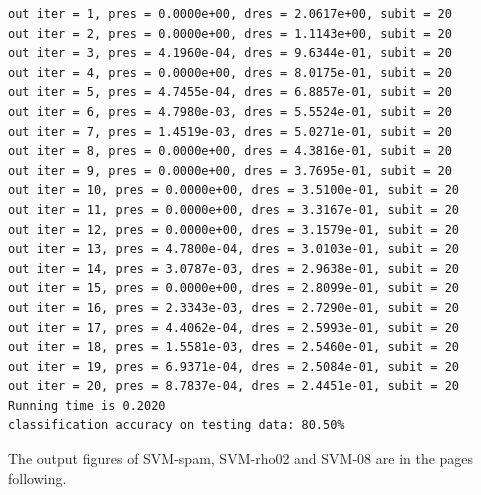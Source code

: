 \documentclass[12pt]{article}
\begin{document}
\begin{verbatim}
out iter = 1, pres = 0.0000e+00, dres = 2.0617e+00, subit = 20
out iter = 2, pres = 0.0000e+00, dres = 1.1143e+00, subit = 20
out iter = 3, pres = 4.1960e-04, dres = 9.6344e-01, subit = 20
out iter = 4, pres = 0.0000e+00, dres = 8.0175e-01, subit = 20
out iter = 5, pres = 4.7455e-04, dres = 6.8857e-01, subit = 20
out iter = 6, pres = 4.7980e-03, dres = 5.5524e-01, subit = 20
out iter = 7, pres = 1.4519e-03, dres = 5.0271e-01, subit = 20
out iter = 8, pres = 0.0000e+00, dres = 4.3816e-01, subit = 20
out iter = 9, pres = 0.0000e+00, dres = 3.7695e-01, subit = 20
out iter = 10, pres = 0.0000e+00, dres = 3.5100e-01, subit = 20
out iter = 11, pres = 0.0000e+00, dres = 3.3167e-01, subit = 20
out iter = 12, pres = 0.0000e+00, dres = 3.1579e-01, subit = 20
out iter = 13, pres = 4.7800e-04, dres = 3.0103e-01, subit = 20
out iter = 14, pres = 3.0787e-03, dres = 2.9638e-01, subit = 20
out iter = 15, pres = 0.0000e+00, dres = 2.8099e-01, subit = 20
out iter = 16, pres = 2.3343e-03, dres = 2.7290e-01, subit = 20
out iter = 17, pres = 4.4062e-04, dres = 2.5993e-01, subit = 20
out iter = 18, pres = 1.5581e-03, dres = 2.5460e-01, subit = 20
out iter = 19, pres = 6.9371e-04, dres = 2.5084e-01, subit = 20
out iter = 20, pres = 8.7837e-04, dres = 2.4451e-01, subit = 20
Running time is 0.2020
classification accuracy on testing data: 80.50%
\end{verbatim}
The output figures of SVM-spam, SVM-rho02 and SVM-08 are in the pages following.
\end{document}
